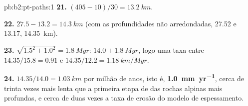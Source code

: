 \begin{solution}{pb:b2:pt-paths:1}
\textbf{21.} $(405 - 10)/30 = \qty{13.2}{km}$.

\textbf{22.} $27.5 - 13.2 = \qty{14.3}{km}$ (com as profundidades não arredondadas, 27.52 e 13.17,
\qty{14.35}{km}).

\textbf{23.} $\sqrt{1.5^2 + 1.0^2} = \qty{1.8}{Myr}$: $14.0 \pm \qty{1.8}{Myr}$, logo uma taxa
entre $14.35/15.8 = 0.91$ e $14.35/12.2 = \qty{1.18}{km/Myr}$.

\textbf{24.} $14.35/14.0 = \qty{1.03}{km}$ por milhão de anos, isto é,
\textbf{\qty[text-series-to-math=true]{1.0}{mm.yr^{-1}}}, cerca de trinta vezes mais lenta que
a primeira etapa de  das rochas alpinas mais profundas, e cerca de duas vezes a taxa de erosão
do modelo de espessamento.
\end{solution}
